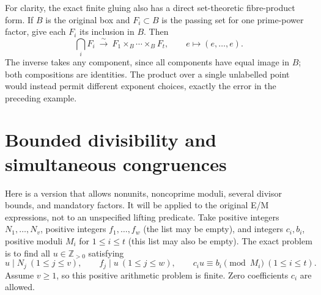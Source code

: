 \documentclass[11pt]{article}
\theoremstyle{definition}\newtheorem{definition}[theorem]{Definition}
\theoremstyle{remark}\newtheorem{remark}[theorem]{Remark}
\newcommand{\Z}{\mathbb Z}\newcommand{\Q}{\mathbb Q}
\begin{document}
For clarity, the exact finite gluing also has a direct
set-theoretic fibre-product form.  If \(B\) is the original
box and \(F_i\subset B\) is the passing set for one prime-power
factor, give each \(F_i\) its inclusion in \(B\).  Then
\[
 \bigcap_i F_i\ \xrightarrow{\sim}\
 F_1\times_B\cdots\times_B F_t,\qquad
 e\longmapsto(e,\ldots,e).
\]
The inverse takes any component, since all components have
equal image in \(B\); both compositions are identities.
The product over a single unlabelled point would instead
permit different exponent choices, exactly the error in
the preceding example.

\section{Bounded divisibility and simultaneous congruences}

Here is a version that allows nonunits, noncoprime moduli, several
divisor bounds, and mandatory factors.  It will be applied to the
original E/M expressions, not to an unspecified lifting predicate.
Take positive integers \(N_1,\ldots,N_v\), positive integers
\(f_1,\ldots,f_w\) (the list may be empty), and integers
\(c_i,b_i\), positive moduli \(M_i\) for \(1\le i\le t\)
(this list may also be empty).  The exact problem is to find all
\(u\in\Z_{>0}\) satisfying
\begin{equation}\label{eq:affine-system}
 u\mid N_j\ (1\le j\le v),\qquad
 f_j\mid u\ (1\le j\le w),\qquad
 c_i u\equiv b_i\pmod{M_i}\ (1\le i\le t).
\end{equation}
Assume \(v\ge1\), so this positive arithmetic problem is finite.
Zero coefficients \(c_i\) are allowed.
\end{document}
